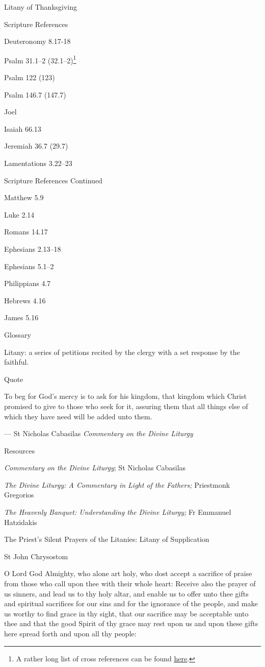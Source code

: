 \documentclass[
]{article}
\begin{document}
Litany of Thanksgiving

Scripture References

Deuteronomy 8.17-18

Psalm 31.1--2 (32.1--2)\footnote{A rather long list of cross references
  can be found
  \href{http://jimmyakin.com/deuterocanonical-references-in-the-new-testament}{\ul{here}}.}

Psalm 122 (123)

Psalm 146.7 (147.7)

Joel

Isaiah 66.13

Jeremiah 36.7 (29.7)

Lamentations 3.22--23

Scripture References Continued

Matthew 5.9

Luke 2.14

Romans 14.17

Ephesians 2.13--18

Ephesians 5.1--2

Philippians 4.7

Hebrews 4.16

James 5.16

Glossary

Litany: a series of petitions recited by the clergy with a set response
by the faithful.

Quote

To beg for God's mercy is to ask for his kingdom, that kingdom which
Christ promised to give to those who seek for it, assuring them that all
things else of which they have need will be added unto them.

--- St Nicholas Cabasilas \emph{Commentary on the Divine Liturgy}

Resources

\emph{Commentary on the Divine Liturgy}; St Nicholas Cabasilas

\emph{The Divine Liturgy: A Commentary in Light of the Fathers;}
Priestmonk Gregorios

\emph{The Heavenly Banquet: Understanding the Divine Liturgy;} Fr
Emmanuel Hatzidakis

The Priest's Silent Prayers of the Litanies: Litany of Supplication

St John Chrysostom

O Lord God Almighty, who alone art holy, who dost accept a sacrifice of
praise from those who call upon thee with their whole heart: Receive
also the prayer of us sinners, and lead us to thy holy altar, and enable
us to offer unto thee gifts and spiritual sacrifices for our sins and
for the ignorance of the people, and make us worthy to find grace in thy
sight, that our sacrifice may be acceptable unto thee and that the good
Spirit of thy grace may rest upon us and upon these gifts here spread
forth and upon all thy people:
\end{document}
